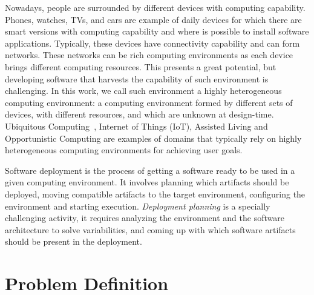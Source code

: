 Nowadays, people are surrounded by different devices with computing capability. Phones, watches, TVs, and cars are example of daily devices for which there are smart versions with computing capability and where is possible to install software applications. Typically, these devices have connectivity capability and can form networks. These networks can be rich computing environments as each device brings different computing resources. This presents a great potential, but developing software that harvests the capability of such environment is challenging.
In this work, we call such environment a highly heterogeneous computing environment: a computing environment formed by different sets of devices, with different resources, and which are unknown at design-time. Ubiquitous Computing~\cite{bell_yesterdays_2007}, Internet of Things (IoT)\cite{atzori_internet_2010}, Assisted Living\cite{kleinberger_ambient_2007} and Opportunistic Computing\cite{smaldone_improving_2011} are examples of domains that typically rely on highly heterogeneous computing environments for achieving user goals.

Software deployment is the process of getting a software ready to be used in a given computing environment\cite{carzaniga_characterization_1998}. It involves planning which artifacts should be deployed, moving compatible artifacts to the target environment, configuring the environment and starting execution. \emph{Deployment planning} is a specially challenging activity, it requires analyzing the environment and the software architecture to solve variabilities, and coming up with which software artifacts should be present in the deployment.


\section{Problem Definition}


